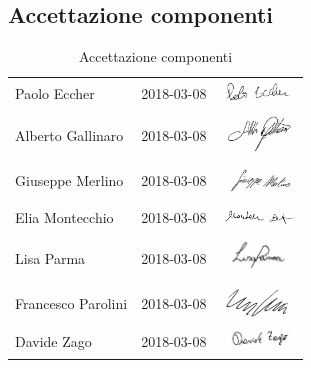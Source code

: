 	\subsection{Accettazione componenti}
		\begin{table}[H]
		\centering
		\begin{tabular}{|p{4cm}|C{4cm}|C{5cm}|}
			\hline
			 & & \\
			\hline			
			Paolo Eccher & 2018-03-08 & \includegraphics[width=2cm]{../../CommonImages/firme/paolo.png}  \\
			\hline
			Alberto Gallinaro & 2018-03-08 & \includegraphics[width=2cm]{../../CommonImages/firme/alberto.png} \\
			\hline
			Giuseppe Merlino & 2018-03-08 & \includegraphics[width=2cm]{../../CommonImages/firme/giuseppe.png} \\
			\hline
			Elia Montecchio & 2018-03-08 & \includegraphics[width=2cm]{../../CommonImages/firme/elia.png} \\
			\hline
			Lisa Parma & 2018-03-08 & \includegraphics[width=2cm]{../../CommonImages/firme/lisa.png} \\
			\hline
			Francesco Parolini & 2018-03-08 & \includegraphics[width=2cm]{../../CommonImages/firme/freppo.png} \\
			\hline
			Davide Zago & 2018-03-08 & \includegraphics[width=2cm]{../../CommonImages/firme/davide.png} \\
			\hline
		\end{tabular}
		\caption{Accettazione componenti}
	\end{table}

